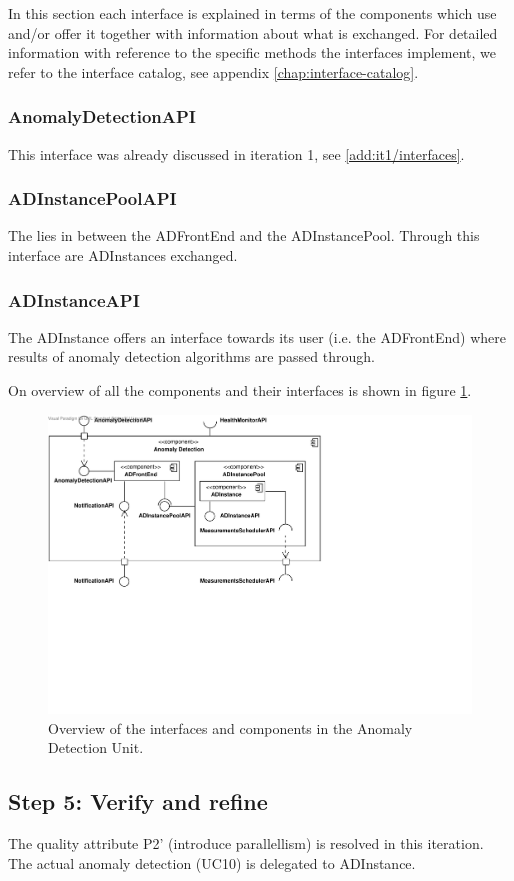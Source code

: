 \npar In this section each interface is explained in terms of the components
which use and/or offer it together with information about what is exchanged. For
detailed information with reference to the specific methods the interfaces
implement, we refer to the interface catalog, see appendix
\ref{chap:interface-catalog}.

\subsubsection{AnomalyDetectionAPI}

\npar This interface was already discussed in iteration 1, see
\ref{add:it1/interfaces}.

\subsubsection{ADInstancePoolAPI}

\npar The  lies in between the ADFrontEnd and the
ADInstancePool. Through this interface are ADInstances exchanged.

\subsubsection{ADInstanceAPI}

\npar The ADInstance offers an interface towards its user (i.e. the ADFrontEnd)
where results of anomaly detection algorithms are passed through.

\npar On overview of all the components and their interfaces is shown in figure
\ref{fig:it6/interfaces}.

\begin{figure}[H]
	\begin{centering}
		\includegraphics[width=\textwidth]{figs/add-it6-interfaces.pdf}
		\caption{Overview of the interfaces and components in the Anomaly Detection
		Unit.}
		\label{fig:it6/interfaces}
	\end{centering}
\end{figure}

\subsection{Step 5: Verify and refine}
\label{add:it6/verification}

\npar The quality attribute P2' (introduce parallellism) is resolved in this
iteration. The actual anomaly detection (UC10) is delegated to ADInstance.
